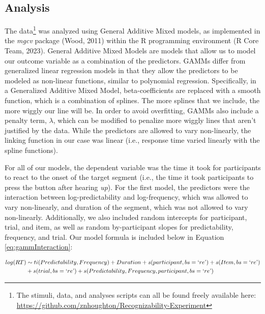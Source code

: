 \documentclass[
  man,floatsintext]{apa6}
\begin{document}
\subsection{Analysis}\label{analysis}

The data\footnote{The stimuli, data, and analyses scripts can all be found freely available here: \url{https://github.com/znhoughton/Recognizability-Experiment}} was analyzed using General Additive Mixed models, as implemented in the \emph{mgcv} package (Wood, 2011) within the R programming environment (R Core Team, 2023). General Additive Mixed Models are models that allow us to model our outcome variable as a combination of the predictors. GAMMs differ from generalized linear regression models in that they allow the predictors to be modeled as non-linear functions, similar to polynomial regression. Specifically, in a Generalized Additive Mixed Model, beta-coefficients are replaced with a smooth function, which is a combination of splines. The more splines that we include, the more wiggly our line will be. In order to avoid overfitting, GAMMs also include a penalty term, \(\lambda\), which can be modified to penalize more wiggly lines that aren't justified by the data. While the predictors are allowed to vary non-linearly, the linking function in our case was linear (i.e., response time varied linearly with the spline functions).

For all of our models, the dependent variable was the time it took for participants to react to the onset of the target segment (i.e., the time it took participants to press the button after hearing \emph{up}). For the first model, the predictors were the interaction between log-predictability and log-frequency, which was allowed to vary non-linearly, and duration of the segment, which was not allowed to vary non-linearly. Additionally, we also included random intercepts for participant, trial, and item, as well as random by-participant slopes for predictability, frequency, and trial. Our model formula is included below in Equation \eqref{eq:gammInteraction}:

\begin{equation}
\begin{aligned}
\label{eq:gammInteraction}
log(RT) & \sim ti(Predictability, Frequency) + Duration + s(participant, bs = `re\text{'}) + s(Item, bs = `re\text{'}) \\
& + s(trial, bs = `re\text{'}) + s(Predictability, Frequency, participant, bs = `re\text{'}) 
\end{aligned}
\end{equation}
\end{document}
